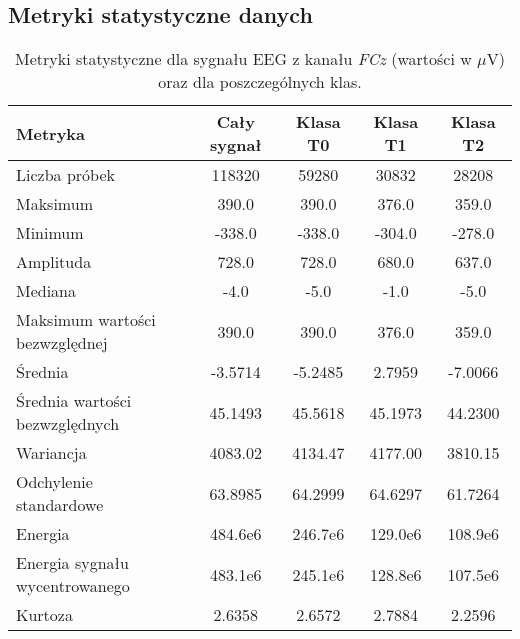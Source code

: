 \documentclass[eeg_v4.tex]{subfiles}
\begin{document}
    \subsection{Metryki statystyczne danych}
    \begin{table}[h]
        \centering
        \caption
        {Metryki statystyczne dla sygnału EEG z kanału \textit{FCz} (wartości w $\mu$V) oraz dla poszczególnych klas.}
        \label{tab:metrics}
        \begin{tabular}{|l|c|c|c|c|}
            \hline
            \textbf{Metryka} & \textbf{Cały sygnał} & \textbf{Klasa T0} & \textbf{Klasa T1} &
            \textbf{Klasa T2} \\
            \hline
            Liczba próbek                  & 118320   & 59280    & 30832     & 28208    \\
            \hline
            Maksimum                       & 390.0    & 390.0    & 376.0     & 359.0    \\
            \hline
            Minimum                        & -338.0   & -338.0   & -304.0    & -278.0   \\
            \hline
            Amplituda                      & 728.0    & 728.0    & 680.0     & 637.0    \\
            \hline
            Mediana                        & -4.0     & -5.0     & -1.0      & -5.0     \\
            \hline
            Maksimum wartości bezwzględnej & 390.0    & 390.0    & 376.0     & 359.0    \\
            \hline
            Średnia                        & -3.5714  & -5.2485  & 2.7959    & -7.0066  \\
            \hline
            Średnia wartości bezwzględnych & 45.1493  & 45.5618  & 45.1973   & 44.2300  \\
            \hline
            Wariancja                      & 4083.02  & 4134.47  & 4177.00   & 3810.15  \\
            \hline
            Odchylenie standardowe         & 63.8985  & 64.2999  & 64.6297   & 61.7264  \\
            \hline
            Energia                        & 484.6e6  & 246.7e6  & 129.0e6   & 108.9e6  \\
            \hline
            Energia sygnału wycentrowanego & 483.1e6  & 245.1e6  & 128.8e6   & 107.5e6  \\
            \hline
            Kurtoza                        & 2.6358   & 2.6572   & 2.7884    & 2.2596   \\

\end{tabular}
\end{table}
\end{document}
